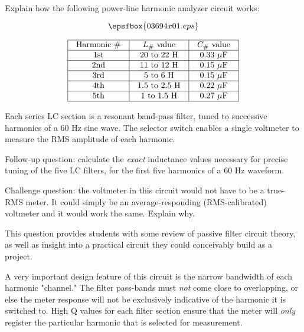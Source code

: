 

Explain how the following power-line harmonic analyzer circuit works:

$$\epsfbox{03694x01.eps}$$


$$\vbox{\offinterlineskip
\halign{\strut
\vrule \quad\hfil # \ \hfil & 
\vrule \quad\hfil # \ \hfil & 
\vrule \quad\hfil # \ \hfil \vrule \cr
\noalign{\hrule}
%
Harmonic \# & $L_{\#}$ value & $C_{\#}$ value \cr
%
\noalign{\hrule}
%
1st & 20 to 22 H & 0.33 $\mu$F \cr
%
\noalign{\hrule}
%
2nd & 11 to 12 H & 0.15 $\mu$F \cr
%
\noalign{\hrule}
%
3rd & 5 to 6 H & 0.15 $\mu$F \cr
%
\noalign{\hrule}
%
4th & 1.5 to 2.5 H & 0.22 $\mu$F \cr
%
\noalign{\hrule}
%
5th & 1 to 1.5 H & 0.27 $\mu$F \cr
%
\noalign{\hrule}
} %
}$$ %







Each series LC section is a resonant band-pass filter, tuned to successive harmonics of a 60 Hz sine wave.  The selector switch enables a single voltmeter to measure the RMS amplitude of each harmonic.

\vskip 10pt

Follow-up question: calculate the {\it exact} inductance values necessary for precise tuning of the five LC filters, for the first five harmonics of a 60 Hz waveform.

\vskip 10pt

Challenge question: the voltmeter in this circuit would not have to be a true-RMS meter.  It could simply be an average-responding (RMS-calibrated) voltmeter and it would work the same.  Explain why.







This question provides students with some review of passive filter circuit theory, as well as insight into a practical circuit they could conceivably build as a project.

A very important design feature of this circuit is the narrow bandwidth of each harmonic "channel."  The filter pass-bands must {\it not} come close to overlapping, or else the meter response will not be exclusively indicative of the harmonic it is switched to.  High Q values for each filter section ensure that the meter will {\it only} register the particular harmonic that is selected for measurement.




